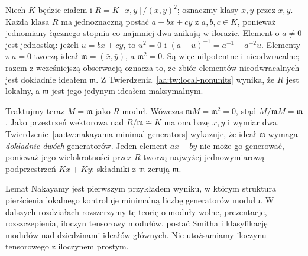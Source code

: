 \begin{przyklad}
\label{aa:prz:nakayama-two-generators-square-zero}
Niech $K$ będzie ciałem i
$R=K[x,y]/(x,y)^2$; oznaczmy klasy $x,y$
przez $\bar x,\bar y$. Każda klasa $R$ ma
jednoznaczną postać $a+b\bar x+c\bar y$
z $a,b,c\in K$, ponieważ jednomiany łącznego stopnia
co najmniej dwa znikają w ilorazie.
Element o $a\ne0$ jest jednostką: jeżeli
$u=b\bar x+c\bar y$, to $u^2=0$ i
$(a+u)^{-1}=a^{-1}-a^{-2}u$.
Elementy z $a=0$ tworzą ideał
$\mathfrak m=(\bar x,\bar y)$, a
$\mathfrak m^2=0$. Są więc nilpotentne i nieodwracalne;
razem z wcześniejszą obserwacją oznacza to, że zbiór
elementów nieodwracalnych jest dokładnie ideałem
$\mathfrak m$. Z Twierdzenia~\ref{aa:tw:local-nonunits}
wynika, że $R$ jest lokalny, a $\mathfrak m$ jest
jego jedynym ideałem maksymalnym.

Traktujmy teraz $M=\mathfrak m$ jako $R$-moduł.
Wówczas $\mathfrak m M=\mathfrak m^2=0$, stąd
$M/\mathfrak m M=\mathfrak m$.
Jako przestrzeń wektorowa nad
$R/\mathfrak m\cong K$ ma ona bazę
$\bar x,\bar y$ i wymiar dwa.
Twierdzenie~\ref{aa:tw:nakayama-minimal-generators}
wykazuje, że ideał $\mathfrak m$ wymaga
\emph{dokładnie dwóch} generatorów.
Jeden element $a\bar x+b\bar y$ nie może go
generować, ponieważ jego wielokrotności przez $R$
tworzą najwyżej jednowymiarową podprzestrzeń
$K\bar x+K\bar y$: składniki z $\mathfrak m$
zerują $\mathfrak m$.
\end{przyklad}

\begin{uwaga}
\label{aa:uw:artin-to-modules}
Lemat Nakayamy jest pierwszym przykładem wyniku,
w którym struktura pierścienia lokalnego kontroluje
minimalną liczbę generatorów modułu.
W dalszych rozdziałach rozszerzymy tę teorię o
moduły wolne, prezentacje, rozszczepienia, iloczyn
tensorowy modułów, postać Smitha i klasyfikację modułów
nad dziedzinami ideałów głównych. Nie utożsamiamy
iloczynu tensorowego z iloczynem prostym.
\end{uwaga}

\setlength{\parskip}{4pt}
